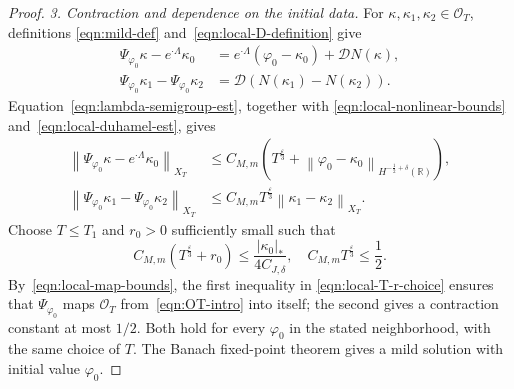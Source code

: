 \documentclass[11pt,reqno]{amsart}
\theoremstyle{plain}
\theoremstyle{definition}
\numberwithin{equation}{section}
\newcommand{\paren}[1]{\left(#1\right)}
\newcommand{\mc}[1]{\mathcal{#1}}
\newcommand{\abs}[1]{\left\lvert #1 \right\rvert}
\newcommand{\norm}[1]{\left\lVert #1 \right\rVert}
\newcommand{\vph}{\varphi}
\newcommand{\R}{\mathbb{R}}
\newcommand{\hr}[1]{H^{#1}(\R)}
\begin{document}
\begin{proof}
\emph{3. Contraction and dependence on the initial data.}
For $\kappa,\kappa_1,\kappa_2\in\mc O_T$, definitions
\eqref{eqn:mild-def} and~\eqref{eqn:local-D-definition} give
\begin{equation*}
    \begin{aligned}
        \Psi_{\vph_0}\kappa-e^{\cdot\Lambda}\kappa_0
        &=e^{\cdot\Lambda}(\vph_0-\kappa_0)+\mc D N(\kappa),\\
        \Psi_{\vph_0}\kappa_1-\Psi_{\vph_0}\kappa_2
        &=\mc D\paren{N(\kappa_1)-N(\kappa_2)}.
    \end{aligned}
\end{equation*}
Equation~\eqref{eqn:lambda-semigroup-est}, together with
\eqref{eqn:local-nonlinear-bounds} and~\eqref{eqn:local-duhamel-est}, gives
\begin{equation}\label{eqn:local-map-bounds}
\begin{aligned}
    \norm{\Psi_{\vph_0}\kappa-e^{\cdot\Lambda}\kappa_0}_{X_T}
    &\le C_{M,m}\paren{
        T^{\frac{\varepsilon}{3}}
        +\norm{\vph_0-\kappa_0}_{\hr{-\frac12+\delta}}
    },\\
    \norm{\Psi_{\vph_0}\kappa_1-\Psi_{\vph_0}\kappa_2}_{X_T}
    &\le C_{M,m}T^{\frac{\varepsilon}{3}}
        \norm{\kappa_1-\kappa_2}_{X_T}.
\end{aligned}
\end{equation}
Choose $T\le T_1$ and $r_0>0$ sufficiently small such that
\begin{equation}\label{eqn:local-T-r-choice}
    C_{M,m}\paren{T^{\frac{\varepsilon}{3}}+r_0}
    \le\frac{\abs{\kappa_0}_*}{4C_{J,\delta}},
    \quad
    C_{M,m}T^{\frac{\varepsilon}{3}}\le\frac12.
\end{equation}
By~\eqref{eqn:local-map-bounds}, the first inequality in
\eqref{eqn:local-T-r-choice} ensures that $\Psi_{\vph_0}$ maps
$\mc O_T$ from~\eqref{eqn:OT-intro} into itself; the second gives
a contraction constant at most $1/2$.
Both hold for every $\vph_0$ in the stated neighborhood, with the same
choice of $T$. The Banach fixed-point theorem
gives a mild solution with initial value $\vph_0$.


\end{proof}
\end{document}
